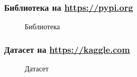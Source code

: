 \documentclass[xetex,mathserif,serif]{beamer}
\begin{document}
	\begin{frame}
		\frametitle{Библиотека на \url{https://pypi.org}}
		\begin{figure}[h]
            \caption{Библиотека}
            \label{fig:image}
        \end{figure}
	\end{frame}	
	
	\begin{frame}
		\frametitle{Датасет на \url{https://kaggle.com}}
		\begin{figure}[h]
            \caption{Датасет}
            \label{fig:image}
        \end{figure}
	\end{frame}
	
\end{document}
